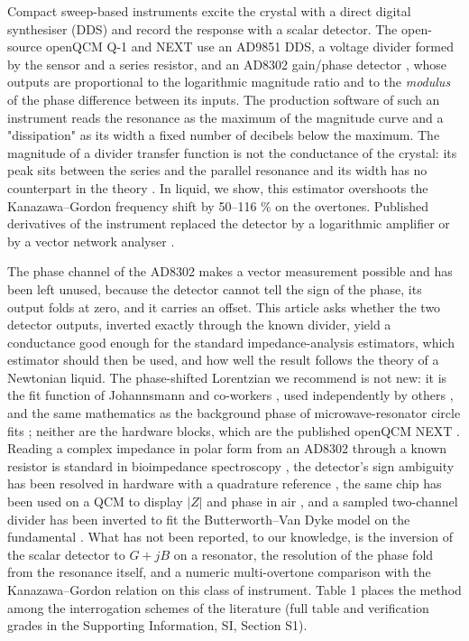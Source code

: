 \documentclass[11pt,a4paper]{article}
\begin{document}
Compact sweep-based instruments excite the crystal with a direct digital synthesiser (DDS) and record the response with a scalar detector. The open-source openQCM Q-1 and NEXT \citep{openQCMQ1, openQCMNEXT} use an AD9851 DDS, a voltage divider formed by the sensor and a series resistor, and an AD8302 gain/phase detector \citep{AD8302Datasheet}, whose outputs are proportional to the logarithmic magnitude ratio and to the \emph{modulus} of the phase difference between its inputs. The production software of such an instrument reads the resonance as the maximum of the magnitude curve and a "dissipation" as its width a fixed number of decibels below the maximum. The magnitude of a divider transfer function is not the conductance of the crystal: its peak sits between the series and the parallel resonance and its width has no counterpart in the theory \citep{Johannsmann2021}. In liquid, we show, this estimator overshoots the Kanazawa--Gordon frequency shift by 50--116 \% on the overtones. Published derivatives of the instrument replaced the detector by a logarithmic amplifier \citep{Horst2022} or by a vector network analyser \citep{Munoz2023, Hardware2026NanoVNA}.

The phase channel of the AD8302 makes a vector measurement possible and has been left unused, because the detector cannot tell the sign of the phase, its output folds at zero, and it carries an offset. This article asks whether the two detector outputs, inverted exactly through the known divider, yield a conductance good enough for the standard impedance-analysis estimators, which estimator should then be used, and how well the result follows the theory of a Newtonian liquid. The phase-shifted Lorentzian we recommend is not new: it is the fit function of Johannsmann and co-workers \citep{Johannsmann2015, Leppin2020, Johannsmann2021, JohannsmannReviakine2024}, used independently by others \citep{rheoQCM, AWSensorsPatent2025}, and the same mathematics as the background phase of microwave-resonator circle fits \citep{Gao2008, PetersanAnlage1998, Khalil2012, Probst2015}; neither are the hardware blocks, which are the published openQCM NEXT \citep{openQCMNEXT}. Reading a complex impedance in polar form from an AD8302 through a known resistor is standard in bioimpedance spectroscopy \citep{Yang2006Bioimpedance, Mohamadou2018, Zompanti2026}, the detector's sign ambiguity has been resolved in hardware with a quadrature reference \citep{McDermott2004, Grossmann2016, Mlynek2017}, the same chip has been used on a QCM to display $\lvert Z\rvert$ and phase in air \citep{Sakti2019}, and a sampled two-channel divider has been inverted to fit the Butterworth--Van Dyke model on the fundamental \citep{Burda2022a, Burda2022b}. What has not been reported, to our knowledge, is the inversion of the scalar detector to $G + jB$ on a resonator, the resolution of the phase fold from the resonance itself, and a numeric multi-overtone comparison with the Kanazawa--Gordon relation on this class of instrument. Table 1 places the method among the interrogation schemes of the literature (full table and verification grades in the Supporting Information, SI, Section S1).
\end{document}
